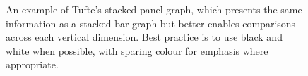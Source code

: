 \begin{figure}[tbp]
\begin{center}
\caption{An example of Tufte's stacked panel graph, which presents the same information as a stacked bar graph but better enables comparisons across each vertical dimension. Best practice is to use black and white when possible, with sparing colour for emphasis where appropriate. }
\label{stackedpanel}
\end{center}
\end{figure}






